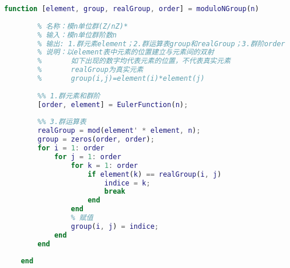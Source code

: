 \begin{lstlisting}[language=Matlab, caption={循环群的单位群}, label={moduloNGroup}]
	function [element, group, realGroup, order] = moduloNGroup(n)
	
	    % 名称：模n单位群(Z/nZ)*
	    % 输入：模n单位群阶数n
	    % 输出: 1.群元素element；2.群运算表group和realGroup；3.群阶order
	    % 说明：以element表中元素的位置建立与元素间的双射
	    %       如下出现的数字均代表元素的位置，不代表真实元素
	    %       realGroup为真实元素
	    %       group(i,j)=element(i)*element(j)
	
	    %% 1.群元素和群阶
	    [order, element] = EulerFunction(n);
	
	    %% 3.群运算表
	    realGroup = mod(element' * element, n);
	    group = zeros(order, order);
	    for i = 1: order
	        for j = 1: order
	            for k = 1: order
	                if element(k) == realGroup(i, j)
	                    indice = k;
	                    break
	                end
	            end
	            % 赋值
	            group(i, j) = indice;
	        end
	    end
	
	end
	
\end{lstlisting}

